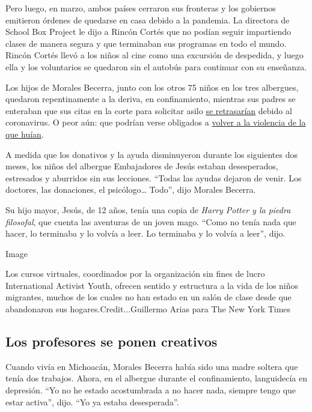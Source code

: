 Pero luego, en marzo, ambos países cerraron sus fronteras y los
gobiernos emitieron órdenes de quedarse en casa debido a la pandemia. La
directora de School Box Project le dijo a Rincón Cortés que no podían
seguir impartiendo clases de manera segura y que terminaban sus
programas en todo el mundo. Rincón Cortés llevó a los niños al cine como
una excursión de despedida, y luego ella y los voluntarios se quedaron
sin el autobús para continuar con su enseñanza.

Los hijos de Morales Becerra, junto con los otros 75 niños en los tres
albergues, quedaron repentinamente a la deriva, en confinamiento,
mientras sus padres se enteraban que sus citas en la corte para
solicitar asilo
\href{https://www.nytimes3xbfgragh.onion/2020/03/17/us/politics/trump-coronavirus-mexican-border.html}{se
retrasarían} debido al coronavirus. O peor aún: que podrían verse
obligados a
\href{https://www.nytimes3xbfgragh.onion/es/2020/03/19/espanol/america-latina/solicitantes-de-asilo-estados-unidos.html}{volver
a la violencia de la que huían}.

A medida que los donativos y la ayuda disminuyeron durante los
siguientes dos meses, los niños del albergue Embajadores de Jesús
estaban desesperados, estresados y aburridos sin sus lecciones. ``Todas
las ayudas dejaron de venir. Los doctores, las donaciones, el
psicólogo\ldots{} Todo'', dijo Morales Becerra.

Su hijo mayor, Jesús, de 12 años, tenía una copia de \emph{Harry Potter
y la piedra filosofal}, que cuenta las aventuras de un joven mago.
``Como no tenía nada que hacer, lo terminaba y lo volvía a leer. Lo
terminaba y lo volvía a leer'', dijo.

Image

Los cursos virtuales, coordinados por la organización sin fines de lucro
International Activist Youth, ofrecen sentido y estructura a la vida de
los niños migrantes, muchos de los cuales no han estado en un salón de
clase desde que abandonaron sus hogares.Credit...Guillermo Arias para
The New York Times

\hypertarget{los-profesores-se-ponen-creativos}{%
\subsection{Los profesores se ponen
creativos}\label{los-profesores-se-ponen-creativos}}

Cuando vivía en Michoacán, Morales Becerra había sido una madre soltera
que tenía dos trabajos. Ahora, en el albergue durante el confinamiento,
languidecía en depresión. ``Yo no he estado acostumbrada a no hacer
nada, siempre tengo que estar activa'', dijo. ``Yo ya estaba
desesperada''.


